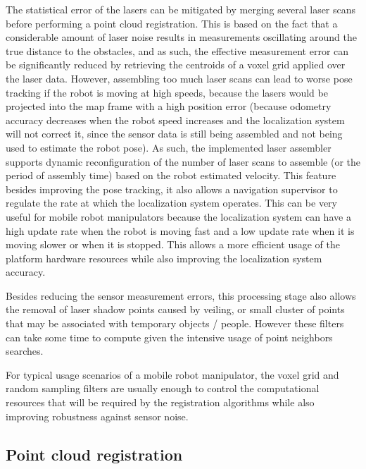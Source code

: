 The statistical error of the lasers can be mitigated by merging several laser scans before performing a point cloud registration. This is based on the fact that a considerable amount of laser noise results in measurements oscillating around the true distance to the obstacles, and as such, the effective measurement error can be significantly reduced by retrieving the centroids of a voxel grid applied over the laser data. However, assembling too much laser scans can lead to worse pose tracking if the robot is moving at high speeds, because the lasers would be projected into the map frame with a high position error (because odometry accuracy decreases when the robot speed increases and the localization system will not correct it, since the sensor data is still being assembled and not being used to estimate the robot pose). As such, the implemented laser assembler supports dynamic reconfiguration of the number of laser scans to assemble (or the period of assembly time) based on the robot estimated velocity. This feature besides improving the pose tracking, it also allows a navigation supervisor to regulate the rate at which the localization system operates. This can be very useful for mobile robot manipulators because the localization system can have a high update rate when the robot is moving fast and a low update rate when it is moving slower or when it is stopped. This allows a more efficient usage of the platform hardware resources while also improving the localization system accuracy.

Besides reducing the sensor measurement errors, this processing stage also allows the removal of laser shadow points caused by veiling, or small cluster of points that may be associated with temporary objects / people. However these filters can take some time to compute given the intensive usage of point neighbors searches.

For typical usage scenarios of a mobile robot manipulator, the voxel grid and random sampling filters are usually enough to control the computational resources that will be required by the registration algorithms while also improving robustness against sensor noise.



\subsection{Point cloud registration}

